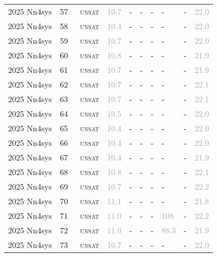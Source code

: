 \begin{center}
{\begin{longtable}{@{}llllllllll@{}}
2025 Nn4sys & 57 & ~\textsc{unsat} & \textcolor{darkgray}{10.7} & - & - & - & - & - & \textcolor{darkgray}{22.0} \\
2025 Nn4sys & 58 & ~\textsc{unsat} & \textcolor{darkgray}{10.4} & - & - & - & - & - & \textcolor{darkgray}{22.0} \\
2025 Nn4sys & 59 & ~\textsc{unsat} & \textcolor{darkgray}{10.7} & - & - & - & - & - & \textcolor{darkgray}{22.0} \\
2025 Nn4sys & 60 & ~\textsc{unsat} & \textcolor{darkgray}{10.8} & - & - & - & - & - & \textcolor{darkgray}{21.9} \\
2025 Nn4sys & 61 & ~\textsc{unsat} & \textcolor{darkgray}{10.7} & - & - & - & - & - & \textcolor{darkgray}{21.9} \\
2025 Nn4sys & 62 & ~\textsc{unsat} & \textcolor{darkgray}{10.7} & - & - & - & - & - & \textcolor{darkgray}{22.1} \\
2025 Nn4sys & 63 & ~\textsc{unsat} & \textcolor{darkgray}{10.7} & - & - & - & - & - & \textcolor{darkgray}{22.1} \\
2025 Nn4sys & 64 & ~\textsc{unsat} & \textcolor{darkgray}{10.5} & - & - & - & - & - & \textcolor{darkgray}{22.0} \\
2025 Nn4sys & 65 & ~\textsc{unsat} & \textcolor{darkgray}{10.4} & - & - & - & - & - & \textcolor{darkgray}{22.0} \\
2025 Nn4sys & 66 & ~\textsc{unsat} & \textcolor{darkgray}{10.4} & - & - & - & - & - & \textcolor{darkgray}{22.0} \\
2025 Nn4sys & 67 & ~\textsc{unsat} & \textcolor{darkgray}{10.4} & - & - & - & - & - & \textcolor{darkgray}{21.9} \\
2025 Nn4sys & 68 & ~\textsc{unsat} & \textcolor{darkgray}{10.8} & - & - & - & - & - & \textcolor{darkgray}{22.1} \\
2025 Nn4sys & 69 & ~\textsc{unsat} & \textcolor{darkgray}{10.7} & - & - & - & - & - & \textcolor{darkgray}{22.2} \\
2025 Nn4sys & 70 & ~\textsc{unsat} & \textcolor{darkgray}{11.1} & - & - & - & - & - & \textcolor{darkgray}{21.8} \\
2025 Nn4sys & 71 & ~\textsc{unsat} & \textcolor{darkgray}{11.0} & - & - & - & \textcolor{darkgray}{108} & - & \textcolor{darkgray}{22.2} \\
2025 Nn4sys & 72 & ~\textsc{unsat} & \textcolor{darkgray}{11.0} & - & - & - & \textcolor{darkgray}{88.3} & - & \textcolor{darkgray}{21.9} \\
2025 Nn4sys & 73 & ~\textsc{unsat} & \textcolor{darkgray}{10.7} & - & - & - & - & - & \textcolor{darkgray}{22.0} \\

\end{longtable}}
\end{center}
